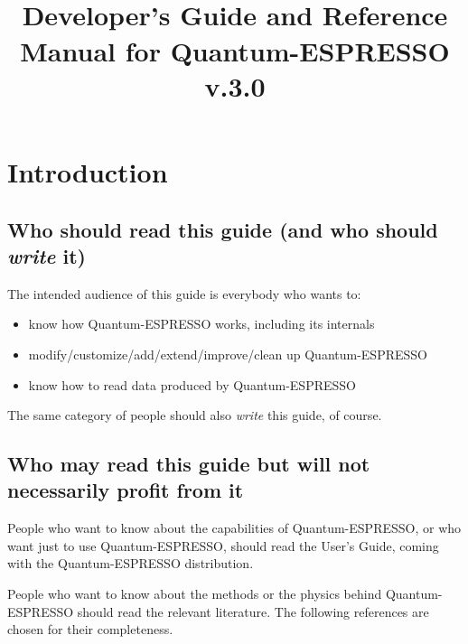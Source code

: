 \documentclass[12pt,a4paper]{article}
\def\version{3.0}
\begin{document}
 

\author{}
\date{}
\title{
  \hfill%
  \vspace{1.5cm}
  \\
  \huge Developer's Guide and Reference Manual for Quantum-ESPRESSO
       v.\version
}
\maketitle

\tableofcontents

\clearpage

\section{Introduction}

\subsection{Who should read this guide (and who should {\em write} it)}

The intended audience of this guide is everybody who wants to:
\begin{itemize}
  \item know how Quantum-ESPRESSO works, including its internals
  \item modify/customize/add/extend/improve/clean up Quantum-ESPRESSO
  \item know how to read data produced by Quantum-ESPRESSO
\end{itemize}
The same category of people should also {\em write} this guide, of course.

\subsection{Who may read this guide but will not necessarily
profit from it}

People who want to know about the capabilities of Quantum-ESPRESSO,
or who want just to use Quantum-ESPRESSO, should read the User's Guide, 
coming with the Quantum-ESPRESSO distribution.

People who want to know about the methods or the physics
behind Quantum-ESPRESSO should read the relevant literature. The
following references are chosen for their completeness.
\medskip
\end{document}
